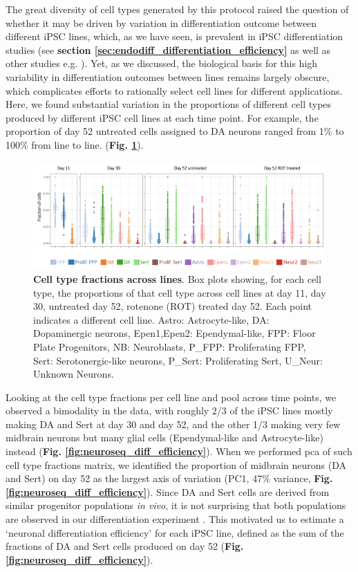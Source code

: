 The great diversity of cell types generated by this protocol raised the question of whether it may be driven by variation in differentiation outcome between different iPSC lines, which, as we have seen, is prevalent in iPSC differentiation studies (see \textbf{section \ref{sec:endodiff_differentiation_efficiency}} as well as other studies e.g. \cite{d2019association, volpato2018reproducibility}). 
Yet, as we discussed, the biological basis for this high variability in differentiation outcomes between lines remains largely obscure, which complicates efforts to rationally select cell lines for different applications. 
Here, we found substantial variation in the proportions of different cell types produced by different iPSC cell lines at each time point. 
For example, the proportion of day 52 untreated cells assigned to DA neurons ranged from 1\% to 100\% from line to line.
(\textbf{Fig. \ref{fig:neuroseq_line_variation}}).

\begin{figure}[h]
\includegraphics[width=15.5cm]{Chapter5/Fig/neuroseq_line_celltype.png}
\caption[Cell type fractions across lines]{\textbf{Cell type fractions across lines}.
Box plots showing, for each cell type, the proportions of that cell type across cell lines at day 11, day 30, untreated day 52, rotenone (ROT) treated day 52. 
Each point indicates a different cell line. 
Astro: Astrocyte-like, DA: Dopaminergic neurons, Epen1,Epen2: Ependymal-like, FPP: Floor Plate Progenitors, NB: Neuroblasts, P\_FPP: Proliferating FPP, Sert: Serotonergic-like neurons, P\_Sert: Proliferating Sert, U\_Neur: Unknown Neurons.}
\label{fig:neuroseq_line_variation}
\end{figure}


Looking at the cell type fractions per cell line and pool across time points, we observed a bimodality in the data, with roughly 2/3 of the iPSC lines mostly making DA and Sert at day 30 and day 52, and the other 1/3 making very few midbrain neurons but many glial cells (Ependymal-like and Astrocyte-like) instead (\textbf{Fig. \ref{fig:neuroseq_diff_efficiency}}).
When we performed \gls{pca} of such cell type fractions matrix, we identified the proportion of midbrain neurons (DA and Sert) on day 52 as the largest axis of variation (PC1, 47\% variance, \textbf{Fig. \ref{fig:neuroseq_diff_efficiency}}). 
Since DA and Sert cells are derived from similar progenitor populations \textit{in vivo}, it is not surprising that both populations are observed in our differentiation experiment \cite{ye1998fgf, cao2017characterization}. 
This motivated us to estimate a `neuronal differentiation efficiency' for each iPSC line, defined as the sum of the fractions of DA and Sert cells produced on day 52 (\textbf{Fig. \ref{fig:neuroseq_diff_efficiency}}). 


